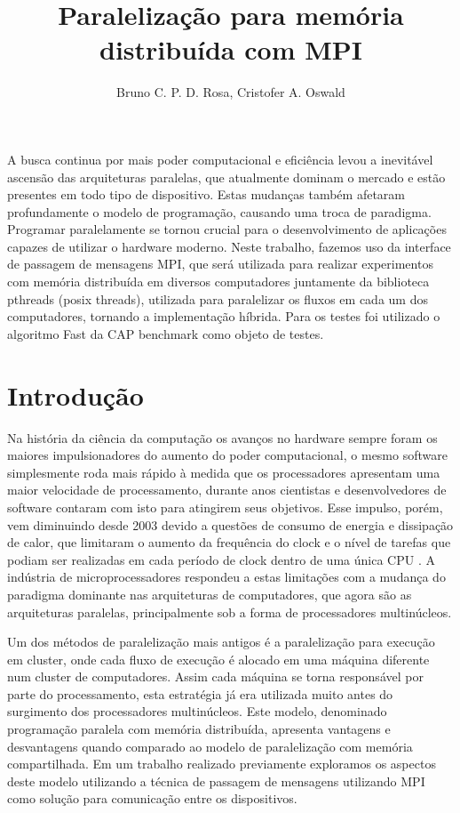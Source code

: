 \documentclass[12pt]{article}
\title{Paralelização para memória distribuída com MPI}
\author{Bruno C. P. D. Rosa, Cristofer A. Oswald}
\begin{document}
 

\maketitle
     
\begin{resumo} 
  A busca continua por mais poder computacional e eficiência levou a inevitável ascensão das arquiteturas paralelas, que atualmente dominam o mercado e estão presentes em todo tipo de dispositivo. Estas mudanças também afetaram profundamente o modelo de programação, causando uma troca de paradigma. Programar paralelamente se tornou crucial para o desenvolvimento de aplicações capazes de utilizar o hardware moderno. Neste trabalho, fazemos uso da interface de passagem de mensagens MPI, que será utilizada para realizar experimentos com memória distribuída em diversos computadores juntamente da biblioteca pthreads (posix threads), utilizada para paralelizar os fluxos em cada um dos computadores, tornando a implementação híbrida. Para os testes foi utilizado o algoritmo Fast da CAP benchmark como objeto de testes.
\end{resumo}


\section{Introdução}
Na história da ciência da computação os avanços no hardware sempre foram os maiores impulsionadores do aumento do poder computacional, o mesmo software simplesmente roda mais rápido à medida que os processadores apresentam uma maior velocidade de processamento, durante anos cientistas e desenvolvedores de software contaram com isto para atingirem seus objetivos. Esse impulso, porém, vem diminuindo desde 2003 devido a questões de consumo de energia e dissipação de calor, que limitaram o aumento da frequência do clock e o nível de tarefas que podiam ser realizadas em cada período de clock dentro de uma única CPU \cite{kirk2011programming}. A indústria de microprocessadores respondeu a estas limitações com a mudança do paradigma dominante nas arquiteturas de computadores, que agora são as arquiteturas paralelas, principalmente sob a forma de processadores multinúcleos.

Um dos métodos de paralelização mais antigos é a paralelização para execução em cluster, onde cada fluxo de execução é alocado em uma máquina diferente num cluster de computadores. Assim cada máquina se torna responsável por parte do processamento, esta estratégia já era utilizada muito antes do surgimento dos processadores multinúcleos. Este modelo, denominado programação paralela com memória distribuída, apresenta vantagens e desvantagens quando comparado ao modelo de paralelização com memória compartilhada. Em um trabalho realizado previamente exploramos os aspectos deste modelo utilizando a técnica de passagem de mensagens utilizando MPI como solução para comunicação entre os dispositivos.
\end{document}
